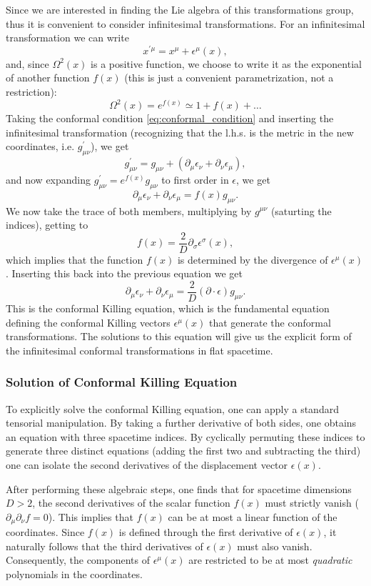 Since we are interested in finding the Lie algebra of this transformations group, thus it is convenient to consider infinitesimal transformations. For an infinitesimal transformation we can write
\[
    x^{\prime\mu}=x^{\mu}+\epsilon^{\mu}(x),
\]
and, since \(\Omega^{2}(x)\) is a positive function, we choose to write it as the exponential of another function \(f(x)\) (this is just a convenient parametrization, not a restriction):
\[
    \Omega^{2}(x)=e^{f(x)}\simeq 1+f(x)+\dots
\]
Taking the conformal condition \eqref{eq:conformal_condition} and inserting the infinitesimal transformation (recognizing that the l.h.s. is the metric in the new coordinates, i.e. \(g_{\mu\nu}^{\prime}\)), we get
\[
    g_{\mu\nu}^{\prime}=g_{\mu\nu}+(\partial_{\mu}\epsilon_{\nu}+\partial_{\nu}\epsilon_{\mu}),
\]
and now expanding \(g_{\mu\nu}^{\prime} = e^{f(x)}g_{\mu\nu}\) to first order in \(\epsilon\), we get
\[
    \partial_{\mu}\epsilon_{\nu}+\partial_{\nu}\epsilon_{\mu}=f(x)g_{\mu\nu}.
\]
We now take the trace of both members, multiplying by \(g^{\mu\nu}\) (saturting the indices), getting to
\[
    f(x)=\frac{2}{D}\partial_{\sigma}\epsilon^{\sigma}(x),
\]
which implies that the function \(f(x)\) is determined by the divergence of \(\epsilon^{\mu}(x)\). Inserting this back into the previous equation we get
\begin{equation}
    \partial_{\mu}\epsilon_{\nu}+\partial_{\nu}\epsilon_{\mu}=\frac{2}{D}(\partial \cdot \epsilon)g_{\mu\nu}.
    \label{eq:conformal_killing_equation}
\end{equation}
This is the conformal Killing equation, which is the fundamental equation defining the conformal Killing vectors \(\epsilon^{\mu}(x)\) that generate the conformal transformations. The solutions to this equation will give us the explicit form of the infinitesimal conformal transformations in flat spacetime.

\subsubsection{Solution of Conformal Killing Equation}
To explicitly solve the conformal Killing equation, one can apply a standard tensorial manipulation. By taking a further derivative of both sides, one obtains an equation with three spacetime indices. By cyclically permuting these indices to generate three distinct equations (adding the first two and subtracting the third) one can isolate the second derivatives of the displacement vector \(\epsilon(x)\).

After performing these algebraic steps, one finds that for spacetime dimensions \(D > 2\), the second derivatives of the scalar function \(f(x)\) must strictly vanish (\(\partial_\mu \partial_\nu f = 0\)). This implies that \(f(x)\) can be at most a linear function of the coordinates. Since \(f(x)\) is defined through the first derivative of \(\epsilon(x)\), it naturally follows that the third derivatives of \(\epsilon(x)\) must also vanish. Consequently, the components of \(\epsilon^\mu(x)\) are restricted to be at most \textit{quadratic} polynomials in the coordinates.

